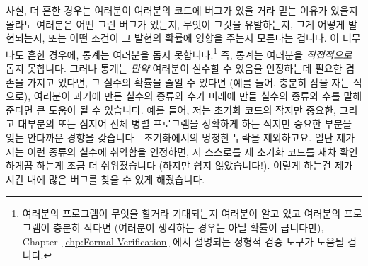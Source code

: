 사실, 더 흔한 경우는 여러분이 여러분의 코드에 버그가 있을 거라 믿는 이유가
있을지 몰라도 여러분은 어떤 그런 버그가 있는지, 무엇이 그것을 유발하는지, 그게
어떻게 발현되는지, 또는 어떤 조건이 그 발현의 확률에 영향을 주는지 모른다는
겁니다.
이 너무나도 흔한 경우에, 통계는 여러분을 돕지 못합니다.\footnote{
	여러분의 프로그램이 무엇을 할거라 기대되는지 여러분이 알고 있고
	여러분의 프로그램이 충분히 작다면 (여러분이 생각하는 경우는 아닐 확률이
	큽니다만),
	Chapter~\ref{chp:Formal Verification} 에서 설명되는
	정형적 검증 도구가 도움될 겁니다.}
즉, 통계는 여러분을 \emph{직접적으로} 돕지 못합니다.
그러나 통계는 \emph{만약} 여러분이 실수할 수 있음을 인정하는데 필요한 겸손을
가지고 있다면, 그 실수의 확률을 줄일 수 있다면 (예를 들어, 충분히 잠을 자는
식으로), 여러분이 과거에 만든 실수의 종류와 수가 미래에 만들 실수의 종류와 수를
말해준다면 큰 도움이 될 수 있습니다.
예를 들어, 저는 초기화 코드의 작지만 중요한, 그리고 대부분의 또는 심지어 전체
병렬 프로그램을 정확하게 하는 작지만 중요한 부분을 잊는 안타까운 경향을
갖습니다---초기화에서의 멍청한 누락을 제외하고요.
일단 제가 저는 이런 종류의 실수에 취약함을 인정하면, 저 스스로를 제 초기화
코드를 재차 확인하게끔 하는게 조금 더 쉬워졌습니다 (하지만 쉽지 않았습니다!).
이렇게 하는건 제가 시간 내에 많은 버그를 찾을 수 있게 해줬습니다.

\iffalse

